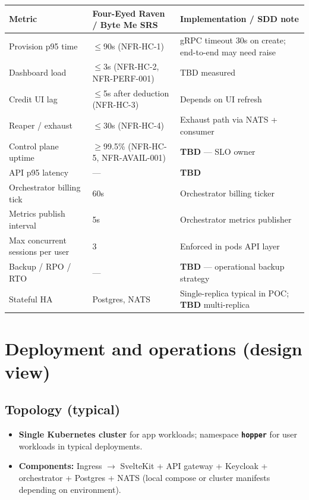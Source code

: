 \documentclass[12pt,a4paper]{article}
\newcommand{\ByteMeHeading}{Byte Me}
\newcommand{\ByteMe}{%
  \texorpdfstring{\textbf{\ByteMeHeading}}{Byte Me}%
}
\begin{document}
\begin{tabularx}{\textwidth}{@{}L{3.8cm} X X@{}}
  \toprule
  \textbf{Metric} & \textbf{Four-Eyed Raven / \ByteMe{} SRS} & \textbf{Implementation / SDD note} \\
  \midrule
  Provision p95 time & $\leq$90s (NFR-HC-1) & gRPC timeout 30s on create; end-to-end may need raise \\
  Dashboard load & $\leq$3s (NFR-HC-2, NFR-PERF-001) & TBD measured \\
  Credit UI lag & $\leq$5s after deduction (NFR-HC-3) & Depends on UI refresh \\
  Reaper / exhaust & $\leq$30s (NFR-HC-4) & Exhaust path via NATS + consumer \\
  Control plane uptime & $\geq$99.5\% (NFR-HC-5, NFR-AVAIL-001) & \textbf{TBD} --- SLO owner \\
  API p95 latency & --- & \textbf{TBD} \\
  Orchestrator billing tick & 60s & Orchestrator billing ticker \\
  Metrics publish interval & 5s & Orchestrator metrics publisher \\
  Max concurrent sessions per user & 3 & Enforced in pods API layer \\
  Backup / RPO / RTO & --- & \textbf{TBD} --- operational backup strategy \\
  Stateful HA & Postgres, NATS & Single-replica typical in POC; \textbf{TBD} multi-replica \\
  \bottomrule
\end{tabularx}

\section{Deployment and operations (design view)}
\label{app:deployment}

\subsection{Topology (typical)}
\begin{itemize}[leftmargin=*]
  \item \textbf{Single Kubernetes cluster} for app workloads; namespace \textbf{\texttt{hopper}} for user workloads in typical deployments.
  \item \textbf{Components:} Ingress $\rightarrow$ SvelteKit + API gateway + Keycloak + orchestrator + Postgres + NATS (local compose or cluster manifests depending on environment).
\end{itemize}
\end{document}
